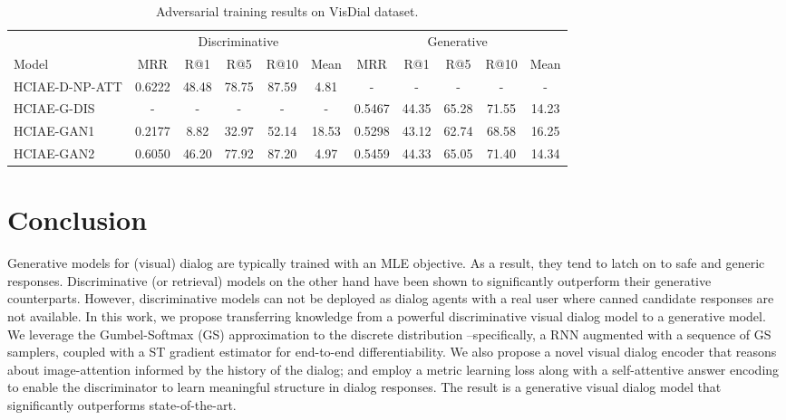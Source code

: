 \documentclass{article}
\newcommand{\vd}{VisDial\xspace}
\newcommand{\ourenc}{HCIAE\xspace}
\begin{document}
\begin{table}[t]\footnotesize
\setlength{\tabcolsep}{5.2pt}
  \caption{Adversarial training results on \vd dataset. }
  \label{tab:gan}
  \centering
  \begin{tabular}{l c c c c c c c c c c}
    \toprule
    \multicolumn{1}{c}{} & \multicolumn{5}{c}{Discriminative}  & \multicolumn{5}{c}{Generative}\\    
   \cmidrule(r){2-6}
   \cmidrule(r){7-11}    
    Model  & MRR & R@1 & R@5 & R@10 & Mean & MRR & R@1 & R@5 & R@10 & Mean\\
    \midrule	    
	\ourenc-D-NP-ATT & 0.6222 & 48.48 & 78.75 & 87.59 & 4.81 & - & - & - & - & -\\
	\ourenc-G-DIS & - & - & - & - & - & 0.5467 &  44.35 &  65.28 &  71.55 & 14.23\\
    \midrule	    
    \ourenc-GAN1 & 0.2177 & 8.82 & 32.97 & 52.14 & 18.53 & 0.5298 & 43.12 & 62.74 & 68.58 & 16.25 \\
    \ourenc-GAN2 &  0.6050 & 46.20 & 77.92 & 87.20 & 4.97 & 0.5459 & 44.33 & 65.05 & 71.40 & 14.34\\
   \bottomrule
  \end{tabular}
  \vspace{-3mm}
\end{table} \section{Conclusion}
\label{sec:con}
\vspace{-1mm}
Generative models for (visual) dialog are typically trained with an MLE objective.
As a result, they tend to latch on to safe and generic responses.
Discriminative (or retrieval) models on the other hand have been shown to significantly outperform 
their generative counterparts. However, discriminative models can not be deployed as dialog agents 
with a real user where canned candidate responses are not available. 
In this work, we propose transferring knowledge from a powerful discriminative visual dialog model to 
a generative model. 
We leverage the Gumbel-Softmax (GS) approximation to the discrete distribution --specifically, a RNN augmented with a sequence of GS samplers, coupled with a ST gradient estimator for end-to-end differentiability.
We also propose a novel visual dialog encoder that reasons about image-attention 
informed by the history of the dialog; and employ a metric learning loss along with a self-attentive answer encoding to enable the discriminator 
to learn meaningful structure in dialog responses.
The result is a generative visual dialog model that significantly outperforms state-of-the-art. 

%
 {\footnotesize


}
\end{document}
